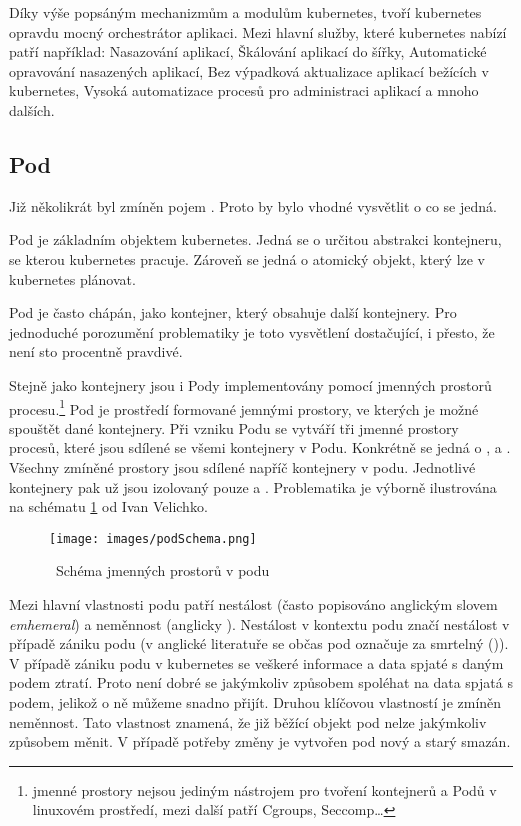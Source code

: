 Díky výše popsáným mechanizmům a modulům kubernetes, tvoří kubernetes opravdu mocný orchestrátor aplikaci. Mezi hlavní služby, které kubernetes nabízí patří například: Nasazování aplikací, Škálování aplikací do šířky, Automatické opravování nasazených aplikací, Bez výpadková aktualizace aplikací bežících v kubernetes, Vysoká automatizace procesů pro administraci aplikací a mnoho dalších.\cite{poulton_2022_the}

\subsection{Pod}

Již několikrát byl zmíněn pojem . Proto by bylo vhodné vysvětlit o co se jedná.

Pod je základním objektem kubernetes. Jedná se o určitou abstrakci kontejneru, se kterou kubernetes pracuje. Zároveň se jedná o atomický objekt, který lze v  kubernetes plánovat. 

Pod je často chápán, jako kontejner, který obsahuje další kontejnery. Pro jednoduché porozumění problematiky je toto vysvětlení dostačující, i přesto, že není sto procentně pravdivé.

Stejně jako kontejnery jsou i Pody implementovány pomocí jmenných prostorů procesu.\footnote{jmenné prostory nejsou jediným nástrojem pro tvoření kontejnerů a Podů v linuxovém prostředí, mezi další patří Cgroups, Seccomp\ldots} Pod je prostředí formované jemnými prostory, ve kterých je možné spouštět dané kontejnery. Při vzniku Podu se vytváří tři jmenné prostory procesů, které jsou sdílené se všemi kontejnery v Podu. Konkrétně se jedná o ,  a . Všechny zmíněné prostory jsou sdílené napříč kontejnery v podu. Jednotlivé kontejnery pak už jsou izolovaný pouze 
a . Problematika je výborně ilustrována na schématu \ref{img:podSchema} od Ivan Velichko.
\begin{figure}[ht]
\centering
\texttt{[image: images/podSchema.png]}
\caption{~Schéma jmenných prostorů v podu}\label{img:podSchema}
\cite{velichko_2021_kubernetes}
\end{figure}

Mezi hlavní vlastnosti podu patří nestálost (často popisováno anglickým slovem \textit{emhemeral}) a neměnnost (anglicky ). Nestálost v kontextu podu značí nestálost v případě zániku podu (v anglické literatuře se občas pod označuje za smrtelný ()). V případě zániku podu v kubernetes se veškeré informace a data spjaté s daným podem ztratí. Proto není dobré se jakýmkoliv způsobem spoléhat na data spjatá s podem, jelikož o ně můžeme snadno přijít. Druhou klíčovou vlastností je zmíněn neměnnost. Tato vlastnost znamená, že již běžící objekt pod nelze jakýmkoliv způsobem měnit. V případě potřeby změny je vytvořen pod nový a starý smazán.\cite{poulton_2022_the}

